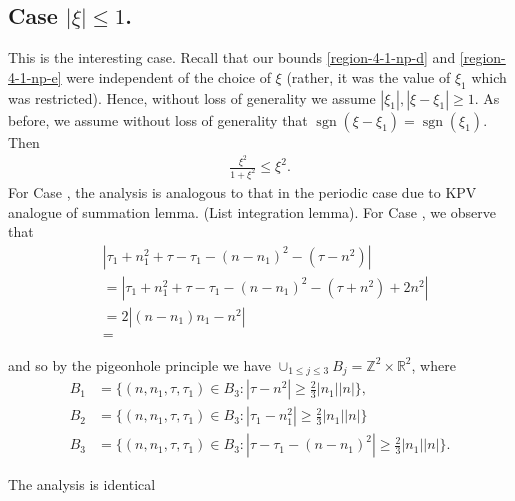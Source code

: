 \documentclass[12pt,reqno]{amsart}
\numberwithin{equation}{section}  %
\renewcommand{\cref}{\Cref}
\DeclareMathOperator{\sgn}{sgn}
\newcommand{\rr}{\mathbb{R}}
\newcommand{\zz}{\mathbb{Z}}
\begin{document}
\subsection{Case $| \xi| \le 1$.} 
\label{ssec:xisimxi1}

%
This is the interesting case. Recall that our bounds 
\eqref{region-4-1-np-d} and \eqref{region-4-1-np-e}
were independent of the choice of $\xi$ (rather, it was the value of $\xi_{1}$ which was restricted). Hence, without loss of generality we assume $| \xi_{1} |, | \xi - \xi_{1} | \ge 1$. As before, we assume without loss of generality that $\sgn(\xi - \xi_{1}) = \sgn(\xi_{1})$. Then
%
%
\begin{equation*}
\begin{split}
\frac{\xi^{2}}{1 + \xi^{2}} \le \xi^{2}.
\end{split}
\end{equation*}
%
%
For Case \cref{it-6-np}, the analysis is analogous to that in the periodic case due to KPV analogue of summation lemma. (List integration lemma).
For Case \cref{it-4-np}, we observe that
\begin{equation*}
\begin{split}
  & | \tau_{1} + n_{1}^{2} + \tau - \tau_{1} - (n - n_{1})^{2} - (\tau - n^{2}) |
  \\
  &=| \tau_{1} + n_{1}^{2} + \tau - \tau_{1} - (n - n_{1})^{2} - (\tau + n^{2}) + 2n^{2} |
  \\
  & = 2|(n - n_{1})n_{1} - n^{2}|
  \\
  & =
\end{split}
\end{equation*}

%
and so by the pigeonhole principle we have $\cup_{1 \le j \le 3} B_{j} = \zz^{2} \times \rr^{2}$, where 
\begin{align*}
  B_{1}&=\{(n, n_1, \tau, \tau_1)\in B_3: |\tau-n^{2}|\ge \frac{2}{3} |n_{1}|| n |\},\\
  B_{2}&=\{(n, n_1, \tau, \tau_1)\in B_3: |\tau_{1}-n_{1}^2|\ge \frac{2}{3} |n_{1}||n | \}\\
  B_{3}&=\{(n, n_1, \tau, \tau_1)\in B_3: |\tau - \tau_{1}-(n - n_{1})^2|\ge \frac{2}{3} |n_{1}||n| \}.
\end{align*} 

The analysis is identical
\label{ssec:}


%
\appendix
%
\end{document}
